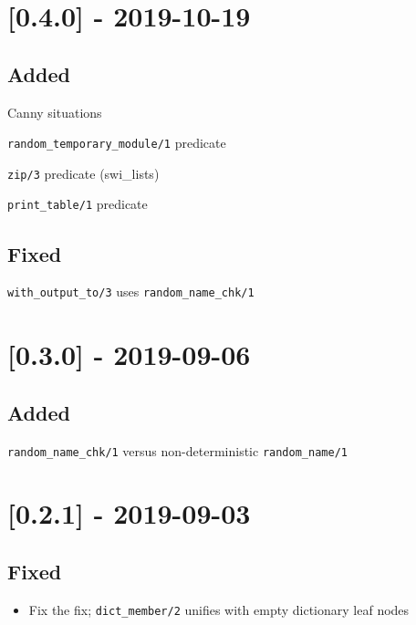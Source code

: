 \section{[0.4.0] - 2019-10-19}

\subsection{Added}

\begin{shortlist}
    \item Canny situations
    \item \verb$random_temporary_module/1$ predicate
    \item \verb$zip/3$ predicate (swi_lists)
    \item \verb$print_table/1$ predicate
\end{shortlist}

\subsection{Fixed}

\begin{shortlist}
    \item \verb$with_output_to/3$ uses \verb$random_name_chk/1$
\end{shortlist}

\section{[0.3.0] - 2019-09-06}

\subsection{Added}

\begin{shortlist}
    \item \verb$random_name_chk/1$ versus non-deterministic \verb$random_name/1$
\end{shortlist}

\section{[0.2.1] - 2019-09-03}

\subsection{Fixed}

\begin{itemize}
    \item Fix the fix; \verb$dict_member/2$ unifies with empty dictionary leaf nodes
\end{itemize}

